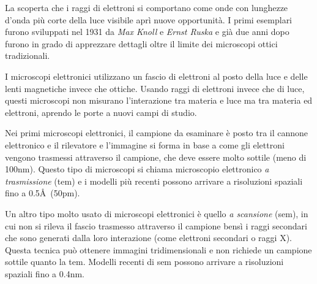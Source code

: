\documentclass[../main.tex]{subfiles}
\begin{document}
La scoperta che i raggi di elettroni si comportano come onde con lunghezze d'onda più corte della luce visibile aprì nuove opportunità. I primi esemplari furono sviluppati nel 1931 da \textit{Max Knoll} e \textit{Ernst Ruska}\cite{oatley1982early} e già due anni dopo furono in grado di apprezzare dettagli oltre il limite dei microscopi ottici tradizionali.\cite{physics_nobel}

I microscopi elettronici utilizzano un fascio di elettroni al posto della luce e delle lenti magnetiche invece che ottiche. Usando raggi di elettroni invece che di luce, questi microscopi non misurano l'interazione tra materia e luce ma tra materia ed elettroni, aprendo le porte a nuovi campi di studio.

Nei primi microscopi elettronici, il campione da esaminare è posto tra il cannone elettronico e il rilevatore e l'immagine si forma in base a come gli elettroni vengono trasmessi attraverso il campione, che deve essere molto sottile (meno di 100nm). Questo tipo di microscopi si chiama microscopio elettronico \textit{a trasmissione} (\acrshort{tem}) e i modelli più recenti possono arrivare a risoluzioni spaziali fino a 0.5\AA\ (50pm).\cite{rolf_2009}

Un altro tipo molto usato di microscopi elettronici è quello \textit{a scansione} (\acrshort{sem}), in cui non si rileva il fascio trasmesso attraverso il campione bensì i raggi secondari che sono generati dalla loro interazione (come elettroni secondari o raggi X). Questa tecnica può ottenere immagini tridimensionali e non richiede un campione sottile quanto la \acrshort{tem}. Modelli recenti di \acrshort{sem} possono arrivare a risoluzioni spaziali fino a 0.4nm.\cite{hitachi_sem}\\
\end{document}
